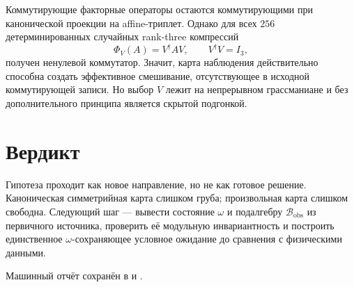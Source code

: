 \documentclass[12pt,a4paper]{article}
\begin{document}
Коммутирующие факторные операторы остаются коммутирующими при канонической
проекции на affine-триплет. Однако для всех \(256\) детерминированных
случайных rank-three компрессий
\[
 \Phi_V(A)=V^\dagger A V,\qquad V^\dagger V=I_3,
\]
получен ненулевой коммутатор. Значит, карта наблюдения действительно способна
создать эффективное смешивание, отсутствующее в исходной коммутирующей
записи. Но выбор \(V\) лежит на непрерывном грассманиане и без
дополнительного принципа является скрытой подгонкой.

\section{Вердикт}

Гипотеза проходит как новое направление, но не как готовое решение.
Каноническая симметрийная карта слишком груба; произвольная карта слишком
свободна. Следующий шаг --- вывести состояние \(\omega\) и подалгебру
\(\mathcal B_{\mathrm{obs}}\) из первичного источника, проверить её модульную
инвариантность и построить единственное \(\omega\)-сохраняющее условное
ожидание до сравнения с физическими данными.

Машинный отчёт сохранён в
 и
.
\end{document}
